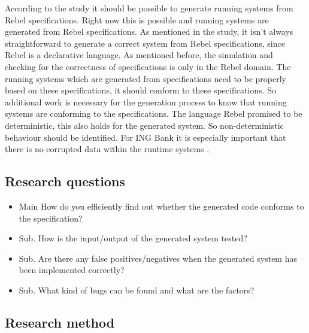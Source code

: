 According to the study \cite[p.3]{stoelcase} it should be possible to generate running systems from Rebel specifications. Right now this is possible and running systems are generated from Rebel specifications. As mentioned in the study, it isn't always straightforward to generate a correct system from Rebel specifications, since Rebel is a declarative language. 
As mentioned before, the simulation and checking for the correctness of specifications is only in the Rebel domain. The running systems which are generated from specifications need to be properly based on these specifications, it should conform to these specifications. So additional work is necessary for the generation process to know that running systems are conforming to the specifications. The language Rebel promised to be deterministic, this also holds for the generated system. So non-deterministic behaviour should be identified. For ING Bank it is especially important that there is no corrupted data within the runtime systems .

\subsection{Research questions}
\label{sec:research-questions}

\begin{itemize}
  \item Main How do you efficiently find out whether the generated code conforms to the specification?

  \item Sub. How is the input/output of the generated system tested?
  \item Sub. Are there any false positives/negatives when the generated system has been implemented correctly?
  \item Sub. What kind of bugs can be found and what are the factors?
\end{itemize}

\subsection{Research method}
\label{sec:research-method}


